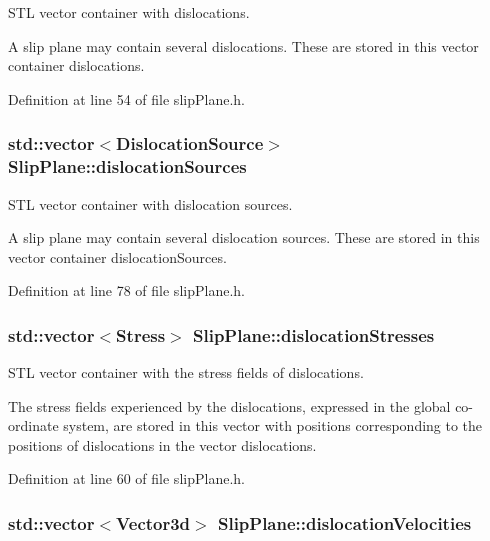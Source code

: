 S\-T\-L vector container with dislocations. 

A slip plane may contain several dislocations. These are stored in this vector container dislocations. 

Definition at line 54 of file slip\-Plane.\-h.

\hypertarget{classSlipPlane_a8e31e904fc6e68cc7ba70b0b57a278cc}{
\subsubsection[{dislocation\-Sources}]{\setlength{\rightskip}{0pt plus 5cm}std\-::vector$<${\bf Dislocation\-Source}$>$ Slip\-Plane\-::dislocation\-Sources\hspace{0.3cm}{\ttfamily [protected]}}}\label{db/d25/classSlipPlane_a8e31e904fc6e68cc7ba70b0b57a278cc}


S\-T\-L vector container with dislocation sources. 

A slip plane may contain several dislocation sources. These are stored in this vector container dislocation\-Sources. 

Definition at line 78 of file slip\-Plane.\-h.

\hypertarget{classSlipPlane_adaa1bb736c2912f5e06e7aa4553c1ebd}{
\subsubsection[{dislocation\-Stresses}]{\setlength{\rightskip}{0pt plus 5cm}std\-::vector$<${\bf Stress}$>$ Slip\-Plane\-::dislocation\-Stresses\hspace{0.3cm}{\ttfamily [protected]}}}\label{db/d25/classSlipPlane_adaa1bb736c2912f5e06e7aa4553c1ebd}


S\-T\-L vector container with the stress fields of dislocations. 

The stress fields experienced by the dislocations, expressed in the global co-\/ordinate system, are stored in this vector with positions corresponding to the positions of dislocations in the vector dislocations. 

Definition at line 60 of file slip\-Plane.\-h.

\hypertarget{classSlipPlane_a107a3883169bf918664cb4e4fd4bd72c}{
\subsubsection[{dislocation\-Velocities}]{\setlength{\rightskip}{0pt plus 5cm}std\-::vector$<${\bf Vector3d}$>$ Slip\-Plane\-::dislocation\-Velocities\hspace{0.3cm}{\ttfamily [protected]}}}\label{db/d25/classSlipPlane_a107a3883169bf918664cb4e4fd4bd72c}


